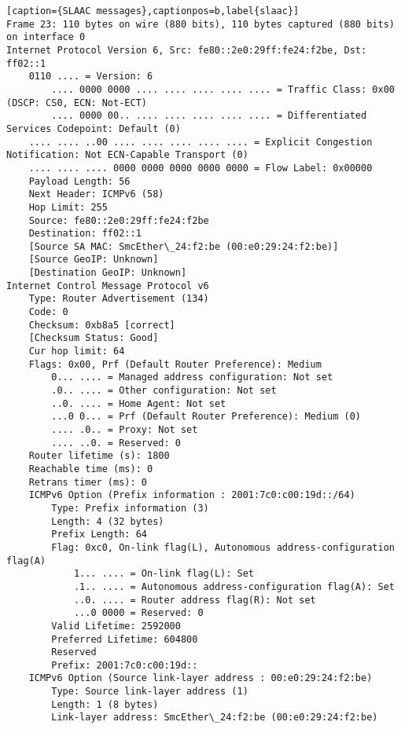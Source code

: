 \begin{lstlisting}[caption={SLAAC messages},captionpos=b,label{slaac}]
Frame 23: 110 bytes on wire (880 bits), 110 bytes captured (880 bits) on interface 0
Internet Protocol Version 6, Src: fe80::2e0:29ff:fe24:f2be, Dst: ff02::1
	0110 .... = Version: 6
		.... 0000 0000 .... .... .... .... .... = Traffic Class: 0x00 (DSCP: CS0, ECN: Not-ECT)
		.... 0000 00.. .... .... .... .... .... = Differentiated Services Codepoint: Default (0)
	.... .... ..00 .... .... .... .... .... = Explicit Congestion Notification: Not ECN-Capable Transport (0)
	.... .... .... 0000 0000 0000 0000 0000 = Flow Label: 0x00000
	Payload Length: 56
	Next Header: ICMPv6 (58)
	Hop Limit: 255
	Source: fe80::2e0:29ff:fe24:f2be
	Destination: ff02::1
	[Source SA MAC: SmcEther\_24:f2:be (00:e0:29:24:f2:be)]
	[Source GeoIP: Unknown]
	[Destination GeoIP: Unknown]
Internet Control Message Protocol v6
	Type: Router Advertisement (134)
	Code: 0
	Checksum: 0xb8a5 [correct]
	[Checksum Status: Good]
	Cur hop limit: 64
	Flags: 0x00, Prf (Default Router Preference): Medium
		0... .... = Managed address configuration: Not set
		.0.. .... = Other configuration: Not set
		..0. .... = Home Agent: Not set
		...0 0... = Prf (Default Router Preference): Medium (0)
		.... .0.. = Proxy: Not set
		.... ..0. = Reserved: 0
	Router lifetime (s): 1800
	Reachable time (ms): 0
	Retrans timer (ms): 0
	ICMPv6 Option (Prefix information : 2001:7c0:c00:19d::/64)
		Type: Prefix information (3)
		Length: 4 (32 bytes)
		Prefix Length: 64
		Flag: 0xc0, On-link flag(L), Autonomous address-configuration flag(A)
			1... .... = On-link flag(L): Set
			.1.. .... = Autonomous address-configuration flag(A): Set
			..0. .... = Router address flag(R): Not set
			...0 0000 = Reserved: 0
		Valid Lifetime: 2592000
		Preferred Lifetime: 604800
		Reserved
		Prefix: 2001:7c0:c00:19d::
	ICMPv6 Option (Source link-layer address : 00:e0:29:24:f2:be)
		Type: Source link-layer address (1)
		Length: 1 (8 bytes)
		Link-layer address: SmcEther\_24:f2:be (00:e0:29:24:f2:be)

\end{lstlisting}
